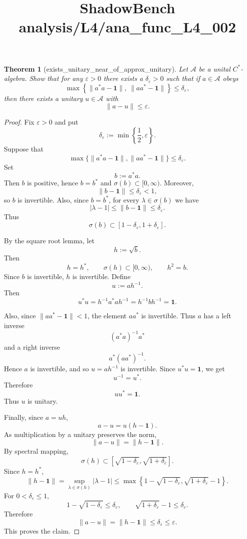 \documentclass{article}
\title{ShadowBench analysis/L4/ana\_func\_L4\_002}
\newtheorem{theorem}{Theorem}
\begin{document}
\maketitle

\begin{theorem}[exists_unitary_near_of_approx_unitary]
Let $\mathcal A$ be a unital $C^*$-algebra. Show that for any $\varepsilon > 0$ there exists a
$\delta_\varepsilon > 0$ such that if $a \in \mathcal A$ obeys
\[
    \max\left\{ \|a^*a-\mathbf 1\|,\ \|aa^*-\mathbf 1\| \right\} \le \delta_\varepsilon,
\]
then there exists a unitary $u \in \mathcal A$ with
\[
    \|a-u\| \le \varepsilon.
\]
\end{theorem}

\begin{proof}
Fix $\varepsilon>0$ and put
\[
    \delta_\varepsilon:=\min\left\{\frac12,\varepsilon\right\}.
\]
Suppose that
\[
    \max\{\|a^*a-\mathbf 1\|,\|aa^*-\mathbf 1\|\}\le \delta_\varepsilon.
\]
Set
\[
    b:=a^*a.
\]
Then $b$ is positive, hence $b=b^*$ and $\sigma(b)\subset[0,\infty)$. Moreover,
\[
    \|b-\mathbf 1\|\le\delta_\varepsilon<1,
\]
so $b$ is invertible. Also, since $b=b^*$, for every $\lambda\in\sigma(b)$ we have
\[
    |\lambda-1|\le \|b-\mathbf 1\|\le \delta_\varepsilon.
\]
Thus
\[
    \sigma(b)\subset[1-\delta_\varepsilon,1+\delta_\varepsilon].
\]

By the square root lemma, let
\[
    h:=\sqrt b.
\]
Then
\[
    h=h^*,\qquad \sigma(h)\subset[0,\infty),\qquad h^2=b.
\]
Since $b$ is invertible, $h$ is invertible. Define
\[
    u:=ah^{-1}.
\]
Then
\[
    u^*u
    =
    h^{-1}a^*ah^{-1}
    =
    h^{-1}bh^{-1}
    =
    \mathbf 1.
\]

Also, since $\|aa^*-\mathbf 1\|<1$, the element $aa^*$ is invertible. Thus $a$ has a left inverse
\[
    (a^*a)^{-1}a^*
\]
and a right inverse
\[
    a^*(aa^*)^{-1}.
\]
Hence $a$ is invertible, and so $u=ah^{-1}$ is invertible. Since $u^*u=\mathbf 1$, we get
\[
    u^{-1}=u^*.
\]
Therefore
\[
    uu^*=\mathbf 1.
\]
Thus $u$ is unitary.

Finally, since $a=uh$,
\[
    a-u=u(h-\mathbf 1).
\]
As multiplication by a unitary preserves the norm,
\[
    \|a-u\|=\|h-\mathbf 1\|.
\]
By spectral mapping,
\[
    \sigma(h)
    \subset
    \left[
        \sqrt{1-\delta_\varepsilon},
        \sqrt{1+\delta_\varepsilon}
    \right].
\]
Since $h=h^*$,
\[
    \|h-\mathbf 1\|
    =
    \sup_{\lambda\in\sigma(h)}|\lambda-1|
    \le
    \max\left\{
        1-\sqrt{1-\delta_\varepsilon},
        \sqrt{1+\delta_\varepsilon}-1
    \right\}.
\]
For $0<\delta_\varepsilon\le 1$,
\[
    1-\sqrt{1-\delta_\varepsilon}\le\delta_\varepsilon,
    \qquad
    \sqrt{1+\delta_\varepsilon}-1\le\delta_\varepsilon.
\]
Therefore
\[
    \|a-u\|
    =
    \|h-\mathbf 1\|
    \le
    \delta_\varepsilon
    \le
    \varepsilon.
\]
This proves the claim.
\end{proof}
\end{document}

